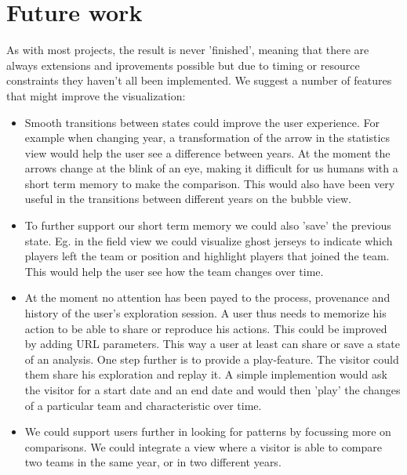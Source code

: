 \documentclass[chi_draft]{sigchi}
\begin{document}
\section{Future work}
As with most projects, the result is never 'finished', meaning that there are
always extensions and iprovements possible but due to timing or resource constraints they haven't all been implemented. We suggest a number of features that might improve the visualization:
\begin{itemize}
    \item Smooth transitions between states could improve the user experience.
        For example when changing year, a transformation of the arrow in the
        statistics view would help the user see a difference between years.  At
        the moment the arrows change at the blink of an eye, making it difficult
        for us humans with a short term memory to make the comparison. This
        would also have been very useful in the transitions between different
        years on the bubble view.
    \item To further support our short term memory we could also 'save' the
        previous state. Eg. in the field view we could visualize ghost jerseys
        to indicate which players left the team or position and highlight
        players that joined the team.  This would help the user see how the team
        changes over time.
    \item At the moment no attention has been payed to the process, provenance
        and history of the user's exploration session. A user thus needs to
        memorize his action to be able to share or reproduce his actions. This
        could be improved by adding URL parameters. This way a user at least can
        share or save a state of an analysis. One step further is to provide a
        play-feature. The visitor could them share his exploration and replay
        it. A simple implemention would ask the visitor for a start date and an
        end date and would then 'play' the changes of a particular team and
        characteristic over time.
    \item We could support users further in looking for patterns by focussing
        more on comparisons. We could integrate a view where a visitor is able
        to compare two teams in the same year, or in two different years.
\end{itemize}
\end{document}
